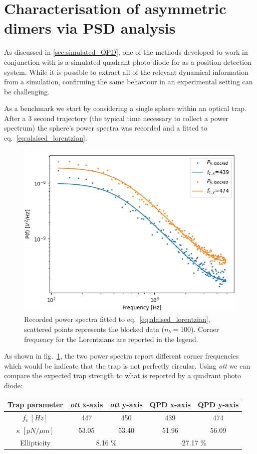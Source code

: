 \section{Characterisation of asymmetric dimers via PSD analysis}
As discussed in \ref{sec:simulated_QPD}, one of the methods
developed to work in conjunction with \cite{Vigilante2020} is 
a simulated quadrant photo diode for as a position detection
system. While it is possible to extract all of the relevant 
dynamical information from a simulation, confirming the same 
behaviour in an experimental setting can be challenging.

As a benchmark we start by considering a single sphere within 
an optical trap. After a 3 second trajectory (the typical time
necessary to collect a power spectrum) the sphere's power 
spectra was recorded and a fitted to eq.~\ref{eq:alaised_lorentzian}.
\begin{figure}[h]
	\label{fig:psd_sphere}
	\centering
	\includegraphics[width=\linewidth]{PSD_sphere.png}
	\caption{Recorded power spectra fitted to eq.~\ref{eq:alaised_lorentzian}, scattered points represents
	the blocked data ($n_b=100$). Corner frequency for the 
	Lorentzians are reported in the legend.}
\end{figure} 

As shown in fig.~\ref{fig:psd_sphere}, the two power spectra
report different corner frequencies which would be indicate 
that the trap is not perfectly circular. Using \textit{ott} 
we can compare the expected trap strength to what is reported
by a quadrant photo diode:
\begin{center}
	\begin{tabular}{ |c|c|c|c|c| } 
		\hline
		Trap parameter & \textit{ott} x-axis & \textit{ott} y-axis & QPD x-axis & QPD y-axis \\
		\hline
		$f_c\ [Hz]$ & 447 & 450 & 439 & 474 \\
		$\kappa\ [pN/\mu m]$ & 53.05 & 53.40 & 51.96 & 56.09 \\
		\hline
		Ellipticity &
		\multicolumn{2}{|c|}{8.16 \%} &
		\multicolumn{2}{|c|}{27.17 \%} \\
		\hline
	\end{tabular}
\end{center}

